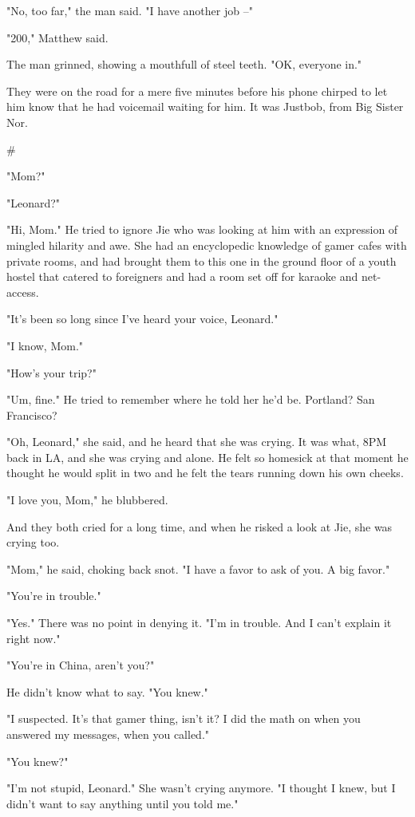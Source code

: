 "No, too far," the man said. "I have another job --"

"200," Matthew said.

The man grinned, showing a mouthfull of steel teeth. "OK, everyone
in."

They were on the road for a mere five minutes before his phone
chirped to let him know that he had voicemail waiting for him. It
was Justbob, from Big Sister Nor.

\#

"Mom?"

"Leonard?"

"Hi, Mom." He tried to ignore Jie who was looking at him with an
expression of mingled hilarity and awe. She had an encyclopedic
knowledge of gamer cafes with private rooms, and had brought them
to this one in the ground floor of a youth hostel that catered to
foreigners and had a room set off for karaoke and net-access.

"It's been so long since I've heard your voice, Leonard."

"I know, Mom."

"How's your trip?"

"Um, fine." He tried to remember where he told her he'd be.
Portland? San Francisco?

"Oh, Leonard," she said, and he heard that she was crying. It was
what, 8PM back in LA, and she was crying and alone. He felt so
homesick at that moment he thought he would split in two and he
felt the tears running down his own cheeks.

"I love you, Mom," he blubbered.

And they both cried for a long time, and when he risked a look at
Jie, she was crying too.

"Mom," he said, choking back snot. "I have a favor to ask of you. A
big favor."

"You're in trouble."

"Yes." There was no point in denying it. "I'm in trouble. And I
can't explain it right now."

"You're in China, aren't you?"

He didn't know what to say. "You knew."

"I suspected. It's that gamer thing, isn't it? I did the math on
when you answered my messages, when you called."

"You knew?"

"I'm not stupid, Leonard." She wasn't crying anymore. "I thought I
knew, but I didn't want to say anything until you told me."

